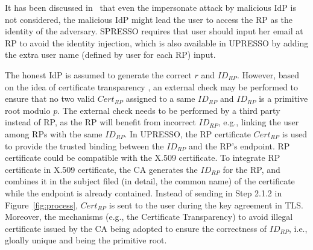  It has been discussed in~\cite{SPRESSO} that even the impersonate attack by malicious IdP is not considered, the malicious IdP might lead the user to access the RP as the identity of the adversary. SPRESSO requires that user should input her email at RP to avoid the identity injection, which is also available in UPRESSO by adding the extra user name (defined by user for each RP) input.



 The honest IdP is assumed to generate the correct $r$ and $ID_{RP}$.
However, based on the idea of certificate transparency \cite{xx},
an external check may be performed to ensure that  no two valid $Cert_{RP}$ assigned to a same $ID_{RP}$ and $ID_{RP}$ is a primitive root modulo $p$.
The external check needs to be performed by a third party instead of RP, as the RP will benefit from incorrect $ID_{RP}$, e.g., linking the user among RPs with the same  $ID_{RP}$.
In UPRESSO, the RP certificate $Cert_{RP}$ is used to provide the trusted binding between the $ID_{RP}$ and the RP's endpoint. RP certificate could be compatible with the X.509 certificate. To integrate RP certificate in X.509 certificate, the CA generates the $ID_{RP}$ for the RP, and combines it in the subject  filed (in detail, the common name)  of the certificate while the endpoint is already contained. Instead of sending  in Step 2.1.2 in Figure~\ref{fig:process}, $Cert_{RP}$  is sent to the user during the key agreement in TLS. Moreover, the mechanisms (e.g., the Certificate Transparency) to avoid illegal certificate issued by the CA being adopted to ensure the correctness of $ID_{RP}$, i.e., gloally unique and being the primitive root.



